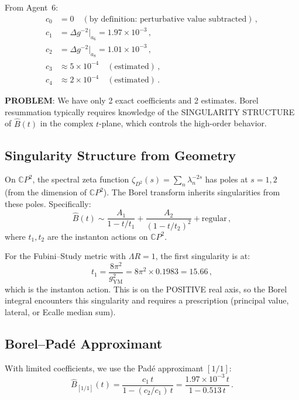 \documentclass[11pt,a4paper]{article}
\newcommand{\CP}{\mathbb{C}P}
\begin{document}
From Agent~6:
\begin{align}
c_0 &= 0 \quad(\text{by definition: perturbative value subtracted})\,, \\
c_1 &= \Delta g^{-2}|_{a_6} = 1.97 \times 10^{-3}\,, \\
c_2 &= \Delta g^{-2}|_{a_8} = 1.01 \times 10^{-3}\,, \\
c_3 &\approx 5 \times 10^{-4}\quad(\text{estimated})\,, \\
c_4 &\approx 2 \times 10^{-4}\quad(\text{estimated})\,.
\end{align}

\textbf{PROBLEM}: We have only 2 exact coefficients and 2 estimates. Borel resummation typically requires knowledge of the SINGULARITY STRUCTURE of $\hat{B}(t)$ in the complex $t$-plane, which controls the high-order behavior.

\subsection{Singularity Structure from Geometry}

On $\CP^2$, the spectral zeta function $\zeta_{D^2}(s) = \sum_n \lambda_n^{-2s}$ has poles at $s = 1, 2$ (from the dimension of $\CP^2$). The Borel transform inherits singularities from these poles. Specifically:
\begin{equation}
\hat{B}(t) \sim \frac{A_1}{1 - t/t_1} + \frac{A_2}{(1 - t/t_2)^2} + \text{regular}\,,
\end{equation}
where $t_1, t_2$ are the instanton actions on $\CP^2$.

For the Fubini--Study metric with $\Lambda R = 1$, the first singularity is at:
\begin{equation}
t_1 = \frac{8\pi^2}{g_{\mathrm{YM}}^2} = 8\pi^2 \times 0.1983 = 15.66\,,
\end{equation}
which is the instanton action. This is on the POSITIVE real axis, so the Borel integral encounters this singularity and requires a prescription (principal value, lateral, or Ecalle median sum).

\subsection{Borel--Pad\'e Approximant}

With limited coefficients, we use the Pad\'e approximant $[1/1]$:
\begin{equation}
\hat{B}_{[1/1]}(t) = \frac{c_1\,t}{1 - (c_2/c_1)\,t} = \frac{1.97 \times 10^{-3}\,t}{1 - 0.513\,t}\,.
\end{equation}
\end{document}
